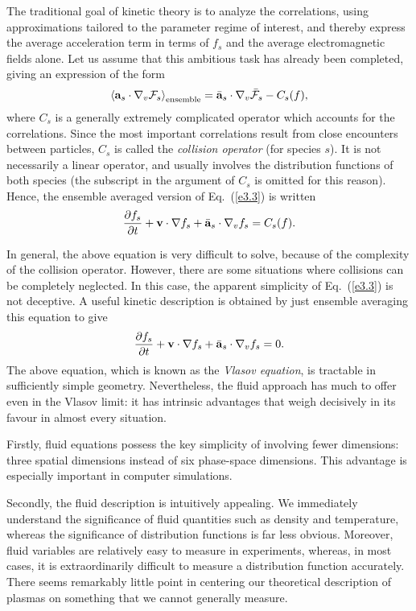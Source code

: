 The traditional goal of kinetic theory is to analyze the correlations,
using approximations tailored to the parameter regime of interest, and
thereby express the average  acceleration term in terms of 
$f_s$ and
the average electromagnetic fields alone. Let us assume that this ambitious
task has already been completed, giving an expression of the form
\begin{equation}
\left\langle{\bf a}_s\cdot\nabla_v {\cal F}_s\right\rangle_{\rm ensemble}
= \bar{\bf a}_s\cdot\nabla_v \bar{{\cal F}}_s -C_s(f),
\end{equation}
where $C_s$ is a generally extremely complicated operator which
accounts for the correlations. Since the most important correlations result from
close encounters between particles, $C_s$ is called the {\em collision operator}\/
(for species $s$). 
It is not necessarily a linear operator, and usually involves the distribution
functions of both species (the subscript in the
argument of $C_s$ is omitted for this reason). Hence, the ensemble averaged
version of Eq.~(\ref{e3.3}) is written
\begin{equation}\label{e3.9}
\frac{\partial{f_s}}{\partial t} + {\bf v}\cdot\nabla f_s
+ \bar{{\bf a}}_s\cdot\nabla_vf_s = C_s(f).
\end{equation}

In general, the above equation is very difficult to solve, because of the
complexity of the collision operator. However, there are some situations
where collisions can be completely neglected. In this case, the
apparent simplicity of Eq.~(\ref{e3.3}) is not deceptive. A useful kinetic
description is obtained by just  ensemble averaging this equation to
give
\begin{equation}
\frac{\partial{f_s}}{\partial t} + {\bf v}\cdot\nabla f_s
+ \bar{{\bf a}}_s\cdot\nabla_vf_s = 0.
\end{equation}
The above equation, which is known as the {\em Vlasov equation}, is tractable
in sufficiently simple geometry. Nevertheless, the fluid approach
has much
to offer even in the Vlasov limit: it has intrinsic advantages that
weigh decisively in its favour in almost every situation.

Firstly, fluid equations possess the key simplicity of involving
fewer dimensions: three spatial dimensions instead of six phase-space
dimensions. This advantage is especially important in computer simulations.

Secondly, the fluid description is intuitively appealing. We 
immediately understand the
significance of fluid quantities such as density and temperature, whereas
the significance of distribution functions is far less obvious.
Moreover, fluid variables are relatively easy to measure in experiments,
whereas, in most cases, it is extraordinarily difficult to measure a
distribution function accurately. There seems
remarkably  little point in centering our
theoretical description of plasmas on something that we cannot
generally measure. 

